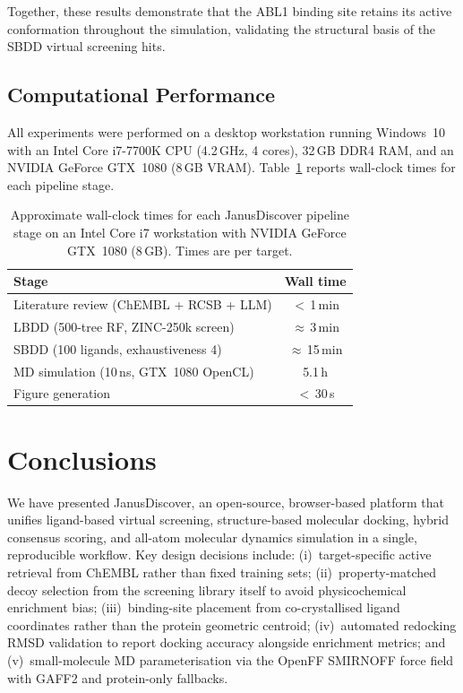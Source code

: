 \documentclass[journal=jcisd8,manuscript=article]{achemso}
\begin{document}
Together, these results demonstrate that the ABL1 binding site retains its
active conformation throughout the simulation, validating the structural
basis of the SBDD virtual screening hits.

\subsection{Computational Performance}

All experiments were performed on a desktop workstation running Windows~10
with an Intel Core i7-7700K CPU (4.2\,GHz, 4 cores), 32\,GB DDR4 RAM,
and an NVIDIA GeForce GTX~1080 (8\,GB VRAM).
Table~\ref{tab:timing} reports wall-clock times for each pipeline stage.

\begin{table}[htbp]
  \centering
  \caption{Approximate wall-clock times for each JanusDiscover pipeline
           stage on an Intel Core i7 workstation with NVIDIA GeForce GTX~1080 (8\,GB).
           Times are per target.}
  \label{tab:timing}
  \begin{tabular}{lc}
    \toprule
    Stage & Wall time \\
    \midrule
    Literature review (ChEMBL + RCSB + LLM) & $<$\,1\,min \\
    LBDD (500-tree RF, ZINC-250k screen)      & $\approx$\,3\,min \\
    SBDD (100 ligands, exhaustiveness 4)       & $\approx$\,15\,min \\
    MD simulation (10\,ns, GTX~1080 OpenCL)   & 5.1\,h \\
    Figure generation                          & $<$\,30\,s \\
    \bottomrule
  \end{tabular}
\end{table}

\section{Conclusions}

We have presented JanusDiscover, an open-source, browser-based platform
that unifies ligand-based virtual screening, structure-based molecular
docking, hybrid consensus scoring, and all-atom molecular dynamics
simulation in a single, reproducible workflow.  Key design decisions include:
(i)~target-specific active retrieval from ChEMBL rather than fixed
training sets; (ii)~property-matched decoy selection from the screening
library itself to avoid physicochemical enrichment bias;
(iii)~binding-site placement from co-crystallised ligand coordinates rather
than the protein geometric centroid; (iv)~automated redocking RMSD
validation to report docking accuracy alongside enrichment metrics; and
(v)~small-molecule MD parameterisation via the OpenFF SMIRNOFF force field
with GAFF2 and protein-only fallbacks.
\end{document}
